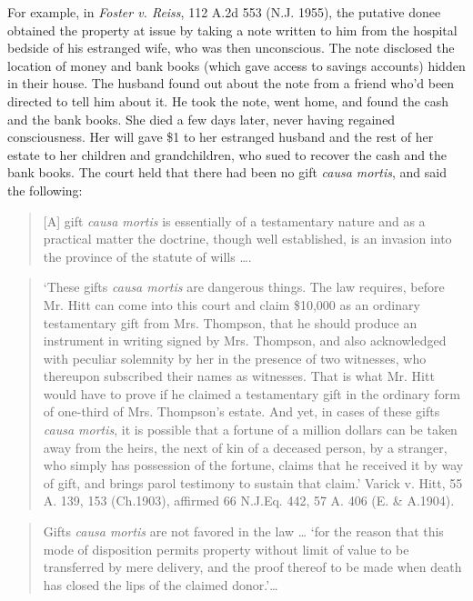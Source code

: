 For example, in\textbf{ }\textit{Foster v. Reiss}, 112 A.2d 553 (N.J. 1955), the
putative donee obtained the property at issue by taking a note written to him
from the hospital bedside of his estranged wife, who was then unconscious.  The
note disclosed the location of money and bank books (which gave access to
savings accounts) hidden in their house.  The husband found out about the note
from a friend who'd been directed to tell him about it.  He took the note, went
home, and found the cash and the bank books.  She died a few days later, never
having regained consciousness.  Her will gave \$1 to her estranged husband and
the rest of her estate to her children and grandchildren, who sued to recover
the cash and the bank books.  The court held that there had been no gift
\textit{causa mortis}, and said the following:

\begin{quote}
[A] gift \textit{causa mortis} is essentially of a testamentary nature and as a
practical matter the doctrine, though well established, is an invasion into the
province of the statute of wills \dots{}. 
\end{quote}

\begin{quote}
{}`These gifts \textit{causa mortis} are dangerous things. The law requires,
before Mr. Hitt can come into this court and claim \$10,000 as an ordinary
testamentary gift from Mrs. Thompson, that he should produce an instrument in
writing signed by Mrs. Thompson, and also acknowledged with peculiar solemnity
by her in the presence of two witnesses, who thereupon subscribed their names
as witnesses. That is what Mr. Hitt would have to prove if he claimed a
testamentary gift in the ordinary form of one-third of Mrs. Thompson's estate.
And yet, in cases of these gifts \textit{causa mortis}, it is possible that a
fortune of a million dollars can be taken away from the heirs, the next of kin
of a deceased person, by a stranger, who simply has possession of the fortune,
claims that he received it by way of gift, and brings parol testimony to
sustain that claim.' Varick v. Hitt, 55 A. 139, 153 (Ch.1903), affirmed 66
N.J.Eq. 442, 57 A. 406 (E. \& A.1904).
\end{quote}

\begin{quote}
Gifts \textit{causa mortis} are not favored in the law \dots{} `for the reason
that this mode of disposition permits property without limit of value to be
transferred by mere delivery, and the proof thereof to be made when death has
closed the lips of the claimed donor.'\dots{}
\end{quote}

